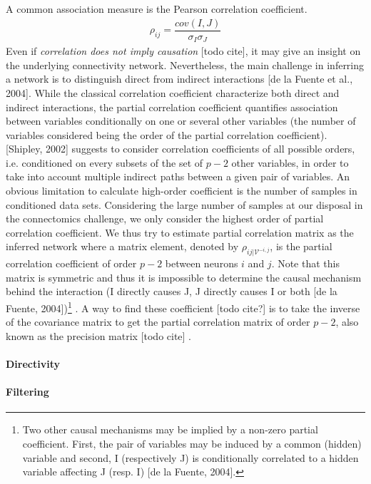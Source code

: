\documentclass[wcp]{jmlr}
\begin{document}
A common association measure is the Pearson correlation coefficient. 
\begin{align}
\rho_{ij} = \dfrac{cov(I,J)}{\sigma_I \sigma_J}
\end{align}
Even if \textit{correlation does not imply causation} [todo cite], it may give an insight on the underlying connectivity network. Nevertheless, the main challenge in inferring a network is to distinguish direct from indirect interactions [de la Fuente et al., 2004]. While the classical correlation coefficient characterize both direct and indirect interactions, the partial correlation coefficient quantifies association between variables conditionally on one or several other variables (the number of variables considered being the order of the partial correlation coefficient). [Shipley, 2002] suggests to consider correlation coefficients of all possible orders, i.e. conditioned on every subsets of the set of $p-2$ other variables, in order to take into account multiple indirect paths between a given pair of variables.  An obvious limitation to calculate high-order coefficient is the number of samples in conditioned data sets. Considering the large number of samples at our disposal in the connectomics challenge, we only consider the highest order of partial correlation coefficient. We thus try to estimate partial correlation matrix as the inferred network where a matrix element, denoted by $\rho_{ij | \mathcal{V}^{-i,j}}$, is the partial correlation coefficient of order $p-2$ between neurons $i$ and $j$. Note that this matrix is symmetric and thus it is impossible to determine the causal mechanism behind the interaction (I directly causes J, J directly causes I or both [de la Fuente, 2004])\footnote{Two other causal mechanisms may be implied by a non-zero partial coefficient. First, the pair of variables may be induced by a common (hidden) variable and second, I (respectively J) is conditionally correlated to a hidden variable affecting J (resp. I) [de la Fuente, 2004].} . A way to find these coefficient [todo cite?] is to take the inverse of the covariance matrix to get the partial correlation matrix of order $p-2$, also known as the precision matrix [todo cite] .

\paragraph{Directivity}

\paragraph{Filtering\\}
\end{document}
